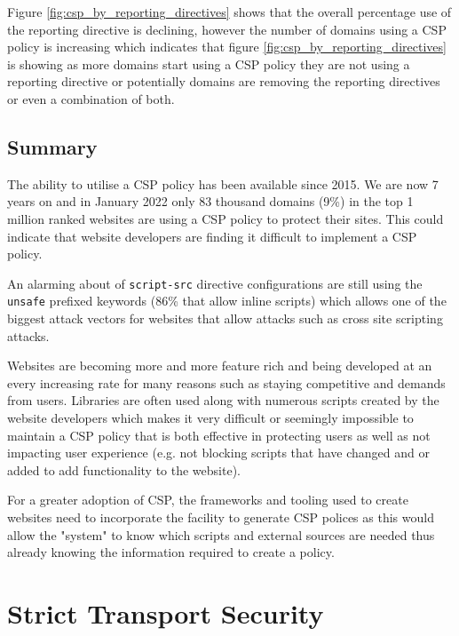 \documentclass{mscreport}
\begin{document}
\vspace{0.3cm} \noindent
Figure \ref{fig:csp_by_reporting_directives} shows that the overall percentage use of the reporting directive is declining, however the number of domains using a CSP policy is increasing which indicates that figure \ref{fig:csp_by_reporting_directives} is showing as more domains start using a CSP policy they are not using a reporting directive or potentially domains are removing the reporting directives or even a combination of both.

\subsection{Summary}

\noindent
The ability to utilise a CSP policy has been available since 2015. We are now 7 years on and in January 2022 only 83 thousand domains (9\%) in the top 1 million ranked websites are using a CSP policy to protect their sites. This could indicate that website developers are finding it difficult to implement a CSP policy.

\vspace{0.3cm} \noindent
An alarming about of \texttt{script-src} directive configurations are still using the \texttt{unsafe} prefixed keywords (86\% that allow inline scripts) which allows one of the biggest attack vectors for websites that allow attacks such as cross site scripting attacks.

\vspace{0.3cm} \noindent
Websites are becoming more and more feature rich and being developed at an every increasing rate for many reasons such as staying competitive and demands from users. Libraries are often used along with numerous scripts created by the website developers which makes it very difficult or seemingly impossible to maintain a CSP policy that is both effective in protecting users as well as not impacting user experience (e.g. not blocking scripts that have changed and or added to add functionality to the website).

\vspace{0.3cm} \noindent
For a greater adoption of CSP, the frameworks and tooling used to create websites need to incorporate the facility to generate CSP polices as this would allow the "system" to know which scripts and external sources are needed thus already knowing the information required to create a policy.

\clearpage
\newpage

\section{Strict Transport Security}
\label{section:ana_STS}
\end{document}
